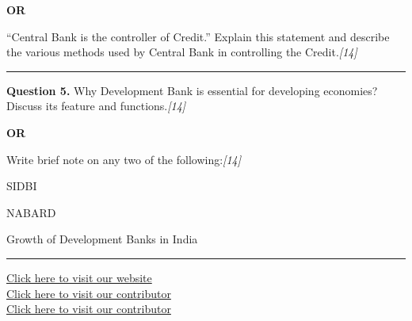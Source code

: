 \documentclass[11pt,a4paper]{article}
\newcommand{\pts}[1]{\hfill   \textit{[#1]}}
\begin{document}
\centerline{   \textbf{OR}}

``Central Bank is the controller of Credit.'' Explain this statement and describe the various methods used by Central Bank in controlling the Credit.\pts{14}

\medskip\rule{\linewidth}{0.2pt}




\noindent   \textbf{Question 5.}
Why Development Bank is essential for developing economies? Discuss its feature and functions.\pts{14}

\centerline{   \textbf{OR}}

Write brief note on any two of the following:\pts{14}

\begin{parts}
  \item SIDBI
  \item NABARD
  \item Growth of Development Banks in India
\end{parts}

\vfill
\rule{\linewidth}{0.4pt}

\begin{center}\small
\href{https://bhu-exam.vercel.app/}{Click here to visit our website}\\[4pt]
\href{https://me-aryan.vercel.app/}{Click here to visit our contributor}\\[4pt]
\href{https://quashan-me.vercel.app/}{Click here to visit our contributor}
\end{center}
\end{document}
